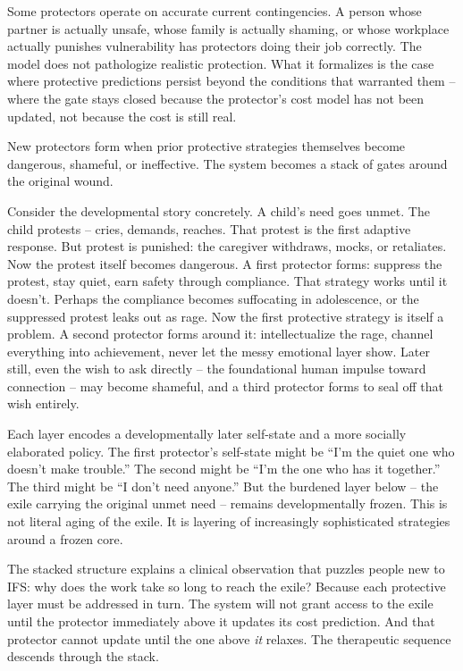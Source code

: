 \documentclass[11pt,a4paper]{article}
\makeatletter
\renewcommand\subsection{\@startsection{subsection}{2}{0pt}{1.8ex plus 0.5ex minus 0.2ex}{0.8ex plus 0.2ex}{\normalsize\bfseries}}
\makeatother
\begin{document}
Some protectors operate on accurate current contingencies. A person
whose partner is actually unsafe, whose family is actually shaming, or
whose workplace actually punishes vulnerability has protectors doing
their job correctly. The model does not pathologize realistic
protection. What it formalizes is the case where protective predictions
persist beyond the conditions that warranted them -- where the gate
stays closed because the protector's cost model has not been updated,
not because the cost is still real.

\subsection{Layered protection}\label{layered-protection}

New protectors form when prior protective strategies themselves become
dangerous, shameful, or ineffective. The system becomes a stack of gates
around the original wound.

Consider the developmental story concretely. A child's need goes unmet.
The child protests -- cries, demands, reaches. That protest is the first
adaptive response. But protest is punished: the caregiver withdraws,
mocks, or retaliates. Now the protest itself becomes dangerous. A first
protector forms: suppress the protest, stay quiet, earn safety through
compliance. That strategy works until it doesn't. Perhaps the compliance
becomes suffocating in adolescence, or the suppressed protest leaks out
as rage. Now the first protective strategy is itself a problem. A second
protector forms around it: intellectualize the rage, channel everything
into achievement, never let the messy emotional layer show. Later still,
even the wish to ask directly -- the foundational human impulse toward
connection -- may become shameful, and a third protector forms to seal
off that wish entirely.

Each layer encodes a developmentally later self-state and a more
socially elaborated policy. The first protector's self-state might be
``I'm the quiet one who doesn't make trouble.'' The second might be
``I'm the one who has it together.'' The third might be ``I don't need
anyone.'' But the burdened layer below -- the exile carrying the
original unmet need -- remains developmentally frozen. This is not
literal aging of the exile. It is layering of increasingly sophisticated
strategies around a frozen core.

The stacked structure explains a clinical observation that puzzles
people new to IFS: why does the work take so long to reach the exile?
Because each protective layer must be addressed in turn. The system will
not grant access to the exile until the protector immediately above it
updates its cost prediction. And that protector cannot update until the
one above \emph{it} relaxes. The therapeutic sequence descends through
the stack.
\end{document}
